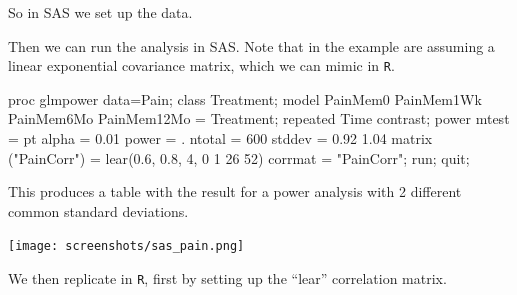 \documentclass[
]{book}
\newenvironment{Shaded}{\begin{snugshade}}{\end{snugshade}}
\newcommand{\DecValTok}[1]{\textcolor[rgb]{0.00,0.00,0.81}{#1}}
\newcommand{\FloatTok}[1]{\textcolor[rgb]{0.00,0.00,0.81}{#1}}
\newcommand{\FunctionTok}[1]{\textcolor[rgb]{0.00,0.00,0.00}{#1}}
\newcommand{\NormalTok}[1]{#1}
\newcommand{\OtherTok}[1]{\textcolor[rgb]{0.56,0.35,0.01}{#1}}
\newcommand{\SpecialCharTok}[1]{\textcolor[rgb]{0.00,0.00,0.00}{#1}}
\newcommand{\StringTok}[1]{\textcolor[rgb]{0.31,0.60,0.02}{#1}}
\begin{document}
So in SAS we set up the data.

\begin{Shaded}
\end{Shaded}

Then we can run the analysis in SAS. Note that in the example \citet{SASglmpower} are assuming a linear exponential covariance matrix, which we can mimic in \texttt{R}.

\begin{Shaded}
\begin{Highlighting}[]
\NormalTok{proc glmpower data}\OtherTok{=}\NormalTok{Pain;}
\NormalTok{class Treatment;}
\NormalTok{model PainMem0 PainMem1Wk PainMem6Mo PainMem12Mo }\OtherTok{=}\NormalTok{ Treatment;}
\NormalTok{repeated Time contrast;}
\NormalTok{power}
\NormalTok{mtest }\OtherTok{=}\NormalTok{ pt }
\NormalTok{alpha }\OtherTok{=} \FloatTok{0.01}
\NormalTok{power }\OtherTok{=}\NormalTok{ .}
\NormalTok{ntotal }\OtherTok{=} \DecValTok{600}
\NormalTok{stddev }\OtherTok{=} \FloatTok{0.92} \FloatTok{1.04}
\FunctionTok{matrix}\NormalTok{ (}\StringTok{"PainCorr"}\NormalTok{) }\OtherTok{=} \FunctionTok{lear}\NormalTok{(}\FloatTok{0.6}\NormalTok{, }\FloatTok{0.8}\NormalTok{, }\DecValTok{4}\NormalTok{, }\DecValTok{0} \DecValTok{1} \DecValTok{26} \DecValTok{52}\NormalTok{)}
\NormalTok{corrmat }\OtherTok{=} \StringTok{"PainCorr"}\NormalTok{;}
\NormalTok{run;}
\NormalTok{quit;}
\end{Highlighting}
\end{Shaded}

This produces a table with the result for a power analysis with 2 different common standard deviations.

\texttt{[image: screenshots/sas\_pain.png]}

We then replicate in \texttt{R}, first by setting up the ``lear'' correlation matrix.
\end{document}
